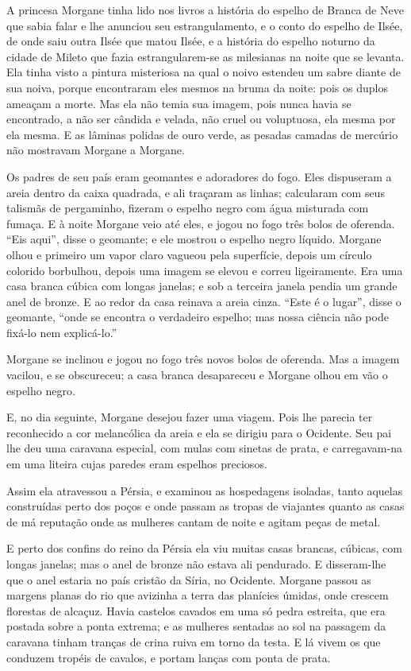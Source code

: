 A princesa Morgane tinha lido nos livros a história do espelho de
Branca de Neve que sabia falar e lhe anunciou seu estrangulamento, e o
conto do espelho de Ilsée, de onde saiu outra Ilsée que matou Ilsée, e a
história do espelho noturno da cidade de Mileto que fazia estrangularem-se
as milesianas na noite que se levanta. Ela tinha visto a pintura
misteriosa na qual o noivo estendeu um sabre diante de sua noiva, porque
encontraram eles mesmos na bruma da noite: pois os duplos ameaçam a
morte. Mas ela não temia sua imagem, pois nunca havia se encontrado, a não
ser cândida e velada, não cruel ou voluptuosa, ela mesma por ela mesma. E
as lâminas polidas de ouro verde, as pesadas camadas de mercúrio não
mostravam Morgane a Morgane.

Os padres de seu país eram geomantes e adoradores do fogo. Eles
dispuseram a areia dentro da caixa quadrada, e ali traçaram as linhas;
calcularam com seus talismãs de pergaminho, fizeram o espelho negro com
água misturada com fumaça. E à noite Morgane veio até eles, e jogou no
fogo três bolos de oferenda. “Eis aqui”, disse o geomante; e ele mostrou o
espelho negro líquido. Morgane olhou e primeiro um vapor claro vagueou
pela superfície, depois um círculo colorido borbulhou, depois uma imagem
se elevou e correu ligeiramente. Era uma casa branca cúbica com longas
janelas; e sob a terceira janela pendia um grande anel de bronze. E ao
redor da casa reinava a areia cinza. “Este é o lugar'', disse o geomante,
``onde se encontra o verdadeiro espelho; mas nossa ciência não pode fixá-lo nem
explicá-lo.”

Morgane se inclinou e jogou no fogo três novos bolos de oferenda. Mas a
imagem vacilou, e se obscureceu; a casa branca desapareceu e Morgane olhou
em vão o espelho negro.

E, no dia seguinte, Morgane desejou fazer uma viagem. Pois lhe parecia
ter reconhecido a cor melancólica da areia e ela se dirigiu para o
Ocidente. Seu pai lhe deu uma caravana especial, com mulas com sinetas de
prata, e carregavam-na em uma liteira cujas paredes eram espelhos
preciosos.

Assim ela atravessou a Pérsia, e examinou as hospedagens isoladas,
tanto aquelas construídas perto dos poços e onde passam as tropas de
viajantes quanto as casas de má reputação onde as mulheres cantam de noite
e agitam peças de metal.

E perto dos confins do reino da Pérsia ela viu muitas casas brancas,
cúbicas, com longas janelas; mas o anel de bronze não estava ali
pendurado. E disseram-lhe que o anel estaria no país cristão da Síria, no
Ocidente.
\pagebreak
Morgane passou as margens planas do rio que avizinha a terra das
planícies úmidas, onde crescem florestas de alcaçuz. Havia castelos
cavados em uma só pedra estreita, que era postada sobre a ponta extrema; e
as mulheres sentadas ao sol na passagem da caravana tinham tranças de
crina ruiva em torno da testa. E lá vivem os que conduzem tropéis de
cavalos, e portam lanças com ponta de prata.

